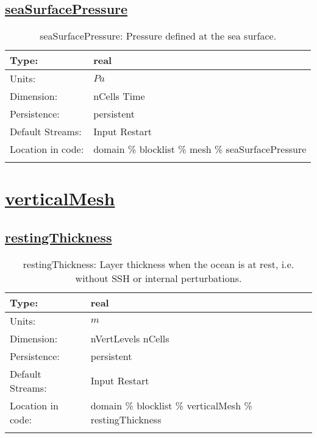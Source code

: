\subsection[seaSurfacePressure]{\hyperref[sec:var_tab_mesh]{seaSurfacePressure}}
\label{subsec:var_sec_mesh_seaSurfacePressure}
\begin{center}
\begin{longtable}{| p{2.0in} | p{4.0in} |}
        \hline 
        Type: & real \\
        \hline 
        Units: & $Pa$ \\
        \hline 
        Dimension: & nCells Time \\
        \hline 
        Persistence: & persistent \\
        \hline 
		 Default Streams: & Input Restart  \\
        \hline 
		 Location in code: & domain \% blocklist \% mesh \% seaSurfacePressure \\
		 \hline 
    \caption{seaSurfacePressure: Pressure defined at the sea surface.}
\end{longtable}
\end{center}
\section[verticalMesh]{\hyperref[sec:var_tab_verticalMesh]{verticalMesh}}
\label{sec:var_sec_verticalMesh}
\subsection[restingThickness]{\hyperref[sec:var_tab_verticalMesh]{restingThickness}}
\label{subsec:var_sec_verticalMesh_restingThickness}
\begin{center}
\begin{longtable}{| p{2.0in} | p{4.0in} |}
        \hline 
        Type: & real \\
        \hline 
        Units: & $m$ \\
        \hline 
        Dimension: & nVertLevels nCells \\
        \hline 
        Persistence: & persistent \\
        \hline 
		 Default Streams: & Input Restart  \\
        \hline 
		 Location in code: & domain \% blocklist \% verticalMesh \% restingThickness \\
		 \hline 
    \caption{restingThickness: Layer thickness when the ocean is at rest, i.e. without SSH or internal perturbations.}
\end{longtable}
\end{center}
